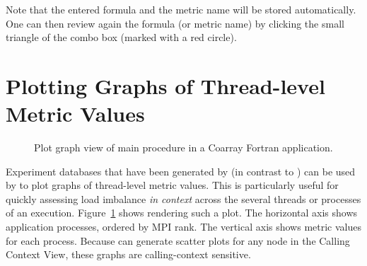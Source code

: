 Note that the entered formula and the metric name will be stored automatically.
One can then review again the formula (or metric name) by clicking the small triangle of the combo box (marked with a red circle).



\section{Plotting Graphs of Thread-level Metric Values}
\label{sec:hpcviewer:plots}

\begin{figure}[t]
\caption{Plot graph view of main procedure in a Coarray Fortran application.}
\label{fig:hpcviewer-view-scatterplot}
\end{figure}


\HPCToolkit{} Experiment databases that have been generated by \hpcprofmpi{} (in contrast to \hpcprof{}) can be used by \hpcviewer{} to plot graphs of thread-level metric values.
This is particularly useful for quickly assessing load imbalance \emph{in context} across the several threads or processes of an execution.
Figure~\ref{fig:hpcviewer-view-scatterplot} shows \hpcviewer{} rendering such a plot.
The horizontal axis shows application processes, ordered by MPI rank.
The vertical axis shows metric values for each process.
Because \hpcviewer{} can generate scatter plots for any node in the Calling Context View, these graphs are calling-context sensitive.

